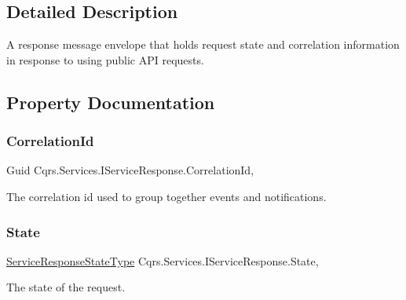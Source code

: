 \subsection{Detailed Description}
A response message envelope that holds request state and correlation information in response to using public A\+PI requests. 



\subsection{Property Documentation}
\mbox{\label{interfaceCqrs_1_1Services_1_1IServiceResponse_a5f6a02ee73059558e9859d7e5fe06025}} 
\subsubsection{\texorpdfstring{Correlation\+Id}{CorrelationId}}
{\footnotesize\ttfamily Guid Cqrs.\+Services.\+I\+Service\+Response.\+Correlation\+Id\hspace{0.3cm}{\ttfamily [get]}, {\ttfamily [set]}}



The correlation id used to group together events and notifications. 

\mbox{\label{interfaceCqrs_1_1Services_1_1IServiceResponse_a946aa90e8fcd82481944c571baaebb2e}} 
\subsubsection{\texorpdfstring{State}{State}}
{\footnotesize\ttfamily \hyperlink{namespaceCqrs_1_1Services_a41411b784c4fcb7eed0cef2a5b522de0}{Service\+Response\+State\+Type} Cqrs.\+Services.\+I\+Service\+Response.\+State\hspace{0.3cm}{\ttfamily [get]}, {\ttfamily [set]}}



The state of the request. 

